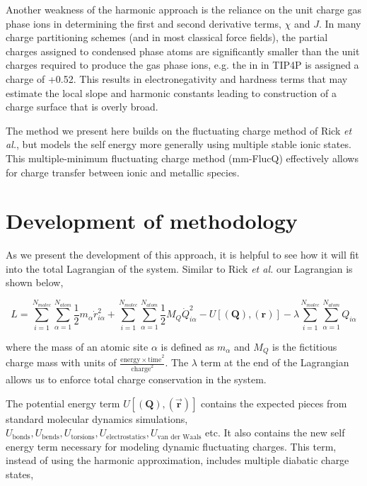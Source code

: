 Another weakness of the harmonic approach is the reliance on the unit charge
gas phase ions in determining the first and second derivative terms, $\chi$ and
$J$.  In many charge partitioning schemes (and in most classical force fields),
the partial charges assigned to condensed phase atoms are significantly smaller
than the unit charges required to produce the gas phase ions, e.g. the 
in  in TIP4P is assigned a charge of +0.52.\citep{Jorgensen:1983tp}
This results in electronegativity and hardness terms that may estimate the
local slope and harmonic constants leading to construction of a charge surface
that is overly broad.

The method we present here builds on the fluctuating charge method of Rick {\it
et al.}\citep{Rick:1994ss}, but models the self energy more generally using
multiple stable ionic states.  This multiple-minimum fluctuating charge method
(mm-FlucQ) effectively allows for charge transfer between ionic and metallic
species.

\section{Development of methodology}

As we present the development of this approach, it is helpful to see how it
will fit into the total Lagrangian of the system. Similar to Rick {\it et
al.}\citep{Rick:1994ss} our Lagrangian is shown below,

\begin{equation}
L = \sum^{N_{molec}}_{i=1}\sum^{N_{atom}}_{\alpha = 1} \frac{1}{2}m_{\alpha} \dot{r}^2_{i\alpha} + \sum^{N_{molec}}_{i=1}\sum^{N_{atom}}_{\alpha = 1} \frac{1}{2}M_Q\dot{Q}^2_{i\alpha} - U[(\mathbf{Q}),(\mathbf{r})] - \lambda \sum^{N_{molec}}_{i=1}\sum^{N_{atom}}_{\alpha = 1} Q_{i\alpha}
\end{equation}

where the mass of an atomic site $\alpha$ is defined as $m_\alpha$ and $M_Q$ is
the fictitious charge mass with units of $\frac{\mathrm{energy\times
time}^2}{\mathrm{charge}^2}$.  The $\lambda$ term at the end of the Lagrangian
allows us to enforce total charge conservation in the system.

The potential energy term $U[(\mathbf{Q}),(\vec{\mathbf{r}})]$ contains the
expected pieces from standard molecular dynamics simulations,
$U_{\text{bonds}}, U_{\text{bends}}, U_{\text{torsions}},
U_{\text{electrostatics}}, U_{\text{van der Waals}}$ etc. It also contains the
new self energy term necessary for modeling dynamic fluctuating charges. This
term, instead of using the harmonic approximation, includes multiple diabatic
charge states,

